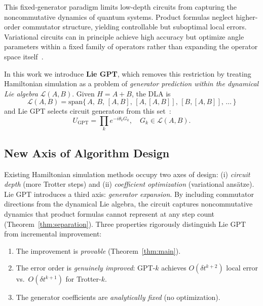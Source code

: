 \documentclass[aps,prxquantum,twocolumn,nofootinbib]{revtex4-2}
\begin{document}
This fixed-generator paradigm limits low-depth circuits from
capturing the noncommutative dynamics of quantum systems. Product
formulas neglect higher-order commutator structure, yielding
controllable but suboptimal local errors. Variational circuits can in
principle achieve high accuracy but optimize angle parameters within a
fixed family of operators rather than expanding the operator space
itself~\cite{larocca2023,ragone2023,anschuetz2022}.

In this work we introduce \textbf{Lie GPT}, which removes this
restriction by treating Hamiltonian simulation as a problem of
\emph{generator prediction within the dynamical Lie algebra}
$\mathcal{L}(A,B)$. Given $H = A + B$, the DLA is
\begin{equation}
  \mathcal{L}(A,B)
  = \mathrm{span}\{\,A,\,B,\,[A,B],\,[A,[A,B]],\,[B,[A,B]],\,\ldots\,\}
\end{equation}
and Lie GPT selects circuit generators from this
set~\cite{gibbs2024,goh2023,goh2024hams}:
\begin{equation}
  U_{\mathrm{GPT}}
  = \prod_k e^{-i\theta_k G_k},
  \quad G_k \in \mathcal{L}(A,B).
  \label{eq:liegpt-ansatz}
\end{equation}

\subsection{New Axis of Algorithm Design}

Existing Hamiltonian simulation methods occupy two axes of design:
(i) \emph{circuit depth} (more Trotter steps) and
(ii) \emph{coefficient optimization} (variational ans\"atze).
Lie GPT introduces a third axis: \emph{generator expansion}.
By including commutator directions from the dynamical Lie algebra,
the circuit captures noncommutative dynamics that product formulas
cannot represent at any step count
(Theorem~\ref{thm:separation}).
Three properties rigorously distinguish Lie GPT from incremental improvement:
\begin{enumerate}
\item The improvement is \emph{provable} (Theorem~\ref{thm:main}).
\item The error order is \emph{genuinely improved}: GPT-$k$ achieves
  $O(\delta t^{k+2})$ local error vs.\ $O(\delta t^{k+1})$ for Trotter-$k$.
\item The generator coefficients are \emph{analytically fixed} (no optimization).
\end{enumerate}
\end{document}

